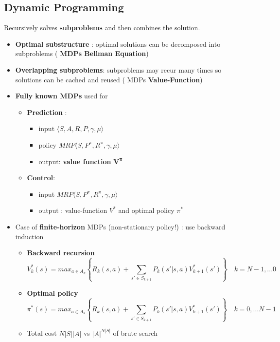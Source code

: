 \documentclass[12pt]{article} %
\begin{document}
\subsection{Dynamic Programming}
Recursively solves \textbf{subproblems} and then combines the solution.
\begin{itemize}
\item \textbf{Optimal substructure} : optimal solutions can be decomposed into subproblems ( \textbf{MDPs Bellman Equation})

\item \textbf{Overlapping subproblems}: subproblems may recur many times so solutions can be cached and reused ( MDPs \textbf{Value-Function})

\item \textbf{Fully known MDPs} used for
\begin{itemize}
\item \textbf{Prediction} : 
\begin{itemize}
\item input $\langle S,A,R,P,\gamma ,\mu \rangle$ 
\item policy $MRP \langle S, P^{\pi},R^{\pi},\gamma,\mu \rangle $ 
\item output: \textbf{value function } $\bm{V^{\pi}}$ 
\end{itemize}

\item \textbf{Control}:
\begin{itemize}
\item input $MRP \langle S, P^{\pi},R^{\pi},\gamma,\mu \rangle $ 
\item output : value-function $V^*$ and optimal policy $\pi^*$
\end{itemize}
\end{itemize}

\item Case of \textbf{finite-horizon} MDPs (non-stationary policy!) : use backward induction
\begin{itemize}
\item \textbf{Backward recursion} 
$$ 	V_k^* (s) = max_{a \in A_k} \left\{ R_k(s,a) + \sum_{s' \in S_{k+1}} P_k(s'|s,a) V^*_{k+1}(s') \right\} \quad k= N-1,...0$$

\item \textbf{Optimal policy}
$$ 	\pi^* (s) = max_{a \in A_k} \left\{ R_k(s,a) + \sum_{s' \in S_{k+1}} P_k(s'|s,a) V^*_{k+1}(s') \right\} \quad k= 0,...N-1$$
\item Total cost $N|S||A|$ vs $|A|^{N|S|}$ of brute search
\end{itemize}
\end{itemize}
\end{document}
